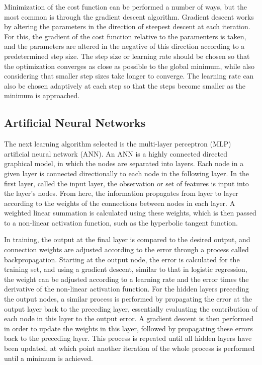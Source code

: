 Minimization of the cost function can be performed a number of ways, but the most common is through the gradient descent algorithm.
Gradient descent works by altering the parameters in the direction of steepest descent at each iteration.
For this, the gradient of the cost function relative to the paramenters is taken, and the parameters are altered in the negative of this direction according to a predetermined step size.
The step size or learning rate should be chosen so that the optimization converges as close as possible to the global minimum, while also considering that smaller step sizes take longer to converge.
The learning rate can also be chosen adaptively at each step so that the steps become smaller as the minimum is approached.

\subsection{Artificial  Neural Networks}

The next learning algorithm selected is the multi-layer perceptron (MLP) artificial neural network (ANN).
An ANN is a highly connected directed graphical model, in which the nodes are separated into layers.
Each node in a given layer is connected directionally to each node in the following layer.
In the first layer, called the input layer, the observation or set of features is input into the layer's nodes.
From here, the information propagates from layer to layer according to the weights of the connections between nodes in each layer.
A weighted linear summation is calculated using these weights, which is then passed to a non-linear activation function, such as the hyperbolic tangent function.


In training, the output at the final layer is compared to the desired output, and connection weights are adjusted according to the error through a process called backpropagation.
Starting at the output node, the error is calculated for the training set, and using a gradient descent, similar to that in logistic regression, the weight can be adjusted according to a learning rate and the error times the derivative of the non-linear activation function.
For the hidden layers preceding the output nodes, a similar process is performed by propagating the error at the output layer back to the preceding layer, essentially evaluating the contribution of each node in this layer to the output error.
A gradient descent is then performed in order to update the weights in this layer, followed by propagating these errors back to the preceding layer.
This process is repeated until all hidden layers have been updated, at which point another iteration of the whole process is performed until a minimum is achieved.


